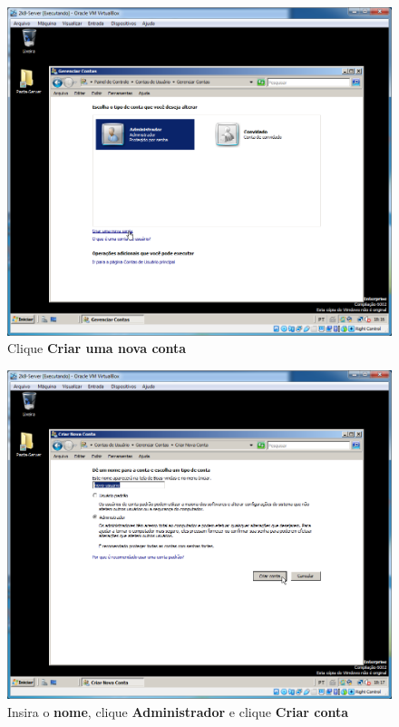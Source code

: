 \documentclass[10pt]{article}
\begin{document}
\begin{figure}[H]
    \centering
    \caption{Clique \textbf{Criar uma nova conta}}
    \label{fig:ar004}
    \includegraphics[width=\linewidth]{images/acesso_remoto/ar004.png}
\end{figure}
\begin{figure}[H]
    \centering
    \caption{Insira o \textbf{nome}, clique \textbf{Administrador} e clique \textbf{Criar conta}}
    \label{fig:ar005}
    \includegraphics[width=\linewidth]{images/acesso_remoto/ar005.png}
\end{figure}
\end{document}

